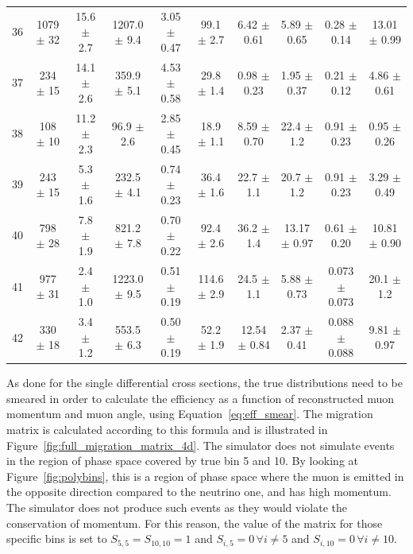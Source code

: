 \begin{table}[]
\begin{adjustwidth}{-2.0cm}{-1.5cm}
\begin{tabular}{c|cc|ccccccc}
36 & 1079 $\pm$ 32 & 15.6 $\pm$ 2.7 & 1207.0 $\pm$ 9.4 & 3.05 $\pm$ 0.47 & 99.1 $\pm$ 2.7 & 6.42 $\pm$ 0.61 & 5.89 $\pm$ 0.65 & 0.28 $\pm$ 0.14 & 13.01 $\pm$ 0.99 \\ 
37 & 234 $\pm$ 15 & 14.1 $\pm$ 2.6 & 359.9 $\pm$ 5.1 & 4.53 $\pm$ 0.58 & 29.8 $\pm$ 1.4 & 0.98 $\pm$ 0.23 & 1.95 $\pm$ 0.37 & 0.21 $\pm$ 0.12 & 4.86 $\pm$ 0.61 \\ 
38 & 108 $\pm$ 10 & 11.2 $\pm$ 2.3 & 96.9 $\pm$ 2.6 & 2.85 $\pm$ 0.45 & 18.9 $\pm$ 1.1 & 8.59 $\pm$ 0.70 & 22.4 $\pm$ 1.2 & 0.91 $\pm$ 0.23 & 0.95 $\pm$ 0.26 \\ 
39 & 243 $\pm$ 15 & 5.3 $\pm$ 1.6 & 232.5 $\pm$ 4.1 & 0.74 $\pm$ 0.23 & 36.4 $\pm$ 1.6 & 22.7 $\pm$ 1.1 & 20.7 $\pm$ 1.2 & 0.91 $\pm$ 0.23 & 3.29 $\pm$ 0.49 \\ 
40 & 798 $\pm$ 28 & 7.8 $\pm$ 1.9 & 821.2 $\pm$ 7.8 & 0.70 $\pm$ 0.22 & 92.4 $\pm$ 2.6 & 36.2 $\pm$ 1.4 & 13.17 $\pm$ 0.97 & 0.61 $\pm$ 0.20 & 10.81 $\pm$ 0.90 \\ 
41 & 977 $\pm$ 31 & 2.4 $\pm$ 1.0 & 1223.0 $\pm$ 9.5 & 0.51 $\pm$ 0.19 & 114.6 $\pm$ 2.9 & 24.5 $\pm$ 1.1 & 5.88 $\pm$ 0.73 & 0.073 $\pm$ 0.073 & 20.1 $\pm$ 1.2 \\ 
42 & 330 $\pm$ 18 & 3.4 $\pm$ 1.2 & 553.5 $\pm$ 6.3 & 0.50 $\pm$ 0.19 & 52.2 $\pm$ 1.9 & 12.54 $\pm$ 0.84 & 2.37 $\pm$ 0.41 & 0.088 $\pm$ 0.088 & 9.81 $\pm$ 0.97 \\ 
\bottomrule
\end{tabular}
\end{adjustwidth}
\end{table}




As done for the single differential cross sections, the true distributions need to be smeared in order to calculate the efficiency as a function of reconstructed muon momentum and muon angle, using Equation~\eqref{eq:eff_smear}. The migration matrix is calculated according to this formula and is illustrated in Figure~\ref{fig:full_migration_matrix_4d}.
The \g simulator does not simulate events in the region of phase space covered by true bin 5 and 10. By looking at Figure~\ref{fig:polybins}, this is a region of phase space where the muon is emitted in the opposite direction compared to the neutrino one, and has high momentum. The simulator does not produce such events as they would violate the conservation of momentum. For this reason, the value of the matrix for those specific bins is set to $S_{5, 5} = S_{10,10} = 1$ and $S_{i,5} = 0 \, \forall i \neq 5$ and $S_{i,10} = 0 \, \forall i \neq 10$.

